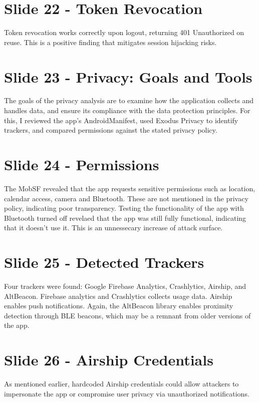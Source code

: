 \documentclass[12pt,a4paper]{article}
\begin{document}
\section*{Slide 22 - Token Revocation}
Token revocation works correctly upon logout, returning 401 Unauthorized on reuse. This is a positive finding that mitigates session hijacking risks.


\section*{Slide 23 - Privacy: Goals and Tools}
The goals of the privacy analysis are to examine how the application collects and handles data, and ensure its compliance with the data protection principles. For this, I reviewed the app's AndroidManifest, used Exodus Privacy to identify trackers, and compared permissions against the stated privacy policy.

\section*{Slide 24 - Permissions}
The MobSF revealed that the app requests sensitive permissions such as location, calendar access, camera and Bluetooth. These are not mentioned in the privacy policy, indicating poor transparency. Testing the functionality of the app with Bluetooth turned off revelaed that the app was still fully functional, indicating that it doesn't use it. This is an unnessecary increase of attack surface.

\section*{Slide 25 - Detected Trackers}
Four trackers were found: Google Firebase Analytics, Crashlytics, Airship, and AltBeacon. Firebase analytics and Crashlytics collects usage data. Airship enables push notifications. Again, the AltBeacon library enables proximity detection through BLE beacons, which may be a remnant from older versions of the app.

\section*{Slide 26 - Airship Credentials}
As mentioned earlier, hardcoded Airship credentials could allow attackers to impersonate the app or compromise user privacy via unauthorized notifications.
\end{document}

